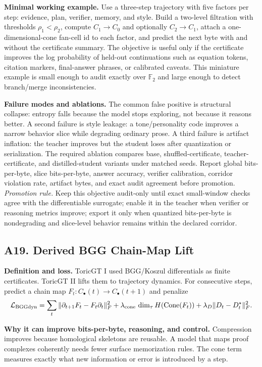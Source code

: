 \documentclass[10pt]{article}
\newcommand{\FF}{\mathbb{F}}
\newcommand{\loss}{\mathcal{L}}
\numberwithin{equation}{section}
\begin{document}
\noindent\textbf{Minimal working example.} Use a three-step trajectory with five factors per step: evidence, plan, verifier, memory, and style. Build a two-level filtration with thresholds $\rho_1<\rho_2$, compute $C_1\to C_0$ and optionally $C_2\to C_1$, attach a one-dimensional-cone fan-cell id to each factor, and predict the next byte with and without the certificate summary. The objective is useful only if the certificate improves the log probability of held-out continuations such as equation tokens, citation markers, final-answer phrases, or calibrated caveats. This miniature example is small enough to audit exactly over $\FF_2$ and large enough to detect branch/merge inconsistencies.

\noindent\textbf{Failure modes and ablations.} The common false positive is structural collapse: entropy falls because the model stops exploring, not because it reasons better. A second failure is style leakage: a tone/personality code improves a narrow behavior slice while degrading ordinary prose. A third failure is artifact inflation: the teacher improves but the student loses after quantization or serialization. The required ablation compares base, shuffled-certificate, teacher-certificate, and distilled-student variants under matched seeds. Report global bits-per-byte, slice bits-per-byte, answer accuracy, verifier calibration, corridor violation rate, artifact bytes, and exact audit agreement before promotion.
\vfill
\noindent\emph{Promotion rule.} Keep this objective audit-only until exact small-window checks agree with the differentiable surrogate; enable it in the teacher when verifier or reasoning metrics improve; export it only when quantized bits-per-byte is nondegrading and slice-level behavior remains within the declared corridor.
\clearpage
\subsection{A19. Derived BGG Chain-Map Lift}
\noindent\textbf{Definition and loss.} ToricGT I used BGG/Koszul differentials as finite certificates. ToricGT II lifts them to trajectory dynamics. For consecutive steps, predict a chain map $F_t:C_\bullet(t)\to C_\bullet(t+1)$ and penalize
\[
\loss_{\rm BGGdyn}=\sum_t\|\partial_{t+1}F_t-F_t\partial_t\|_F^2+\lambda_{\rm cone}\,\dim_\tau H(\mathrm{Cone}(F_t))+\lambda_D\|D_t-D_t^\star\|_F^2.
\]

\noindent\textbf{Why it can improve bits-per-byte, reasoning, and control.} Compression improves because homological skeletons are reusable. A model that maps proof complexes coherently needs fewer surface memorization rules. The cone term measures exactly what new information or error is introduced by a step.
\end{document}
